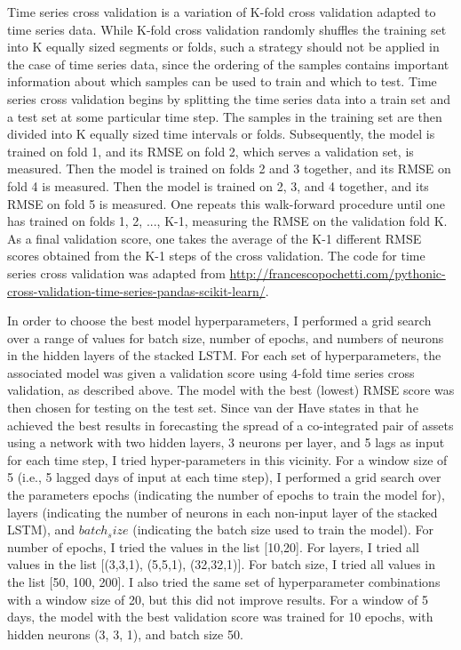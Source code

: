 \documentclass{article}
\begin{document}
Time series cross validation is a variation of K-fold cross validation adapted to time series data. While K-fold cross validation randomly shuffles the training set into K equally sized segments or folds, such a strategy should not be applied in the case of time series data, since the ordering of the samples contains important information about which samples can be used to train and which to test. Time series cross validation begins by splitting the time series data into a train set and a test set at some particular time step. The samples in the training set are then divided into K equally sized time intervals or folds. Subsequently, the model is trained on fold 1, and its RMSE on fold 2, which serves a validation set, is measured. Then the model is trained on folds 2 and 3 together, and its RMSE on fold 4 is measured. Then the model is trained on 2, 3, and 4 together, and its RMSE on fold 5 is measured. One repeats this walk-forward procedure until one has trained on folds 1, 2, ..., K-1, measuring the RMSE on the validation fold K. As a final validation score, one takes the average of the K-1 different RMSE scores obtained from the K-1 steps of the cross validation. The code for time series cross validation was adapted from \url{http://francescopochetti.com/pythonic-cross-validation-time-series-pandas-scikit-learn/}. 

In order to choose the best model hyperparameters, I performed a grid search over a range of values for batch size, number of epochs, and numbers of neurons in the hidden layers of the stacked LSTM. For each set of hyperparameters, the associated model was given a validation score using $4$-fold time series cross validation, as described above. The model with the best (lowest) RMSE score was then chosen for testing on the test set.  Since van der Have states in \cite{van2017pairs} that he achieved the best results in forecasting the spread of a co-integrated pair of assets using a network with two hidden layers, 3 neurons per layer, and 5 lags as input for each time step, I tried hyper-parameters in this vicinity. For a window size  of 5 (i.e., 5 lagged days of input at each time step), I performed a grid search over the parameters epochs (indicating the number of epochs to train the model for), layers (indicating the number of neurons in each non-input layer of the stacked LSTM), and $batch_size$ (indicating the batch size used to train the model). For number of epochs, I tried the values in the list [10,20]. For layers, I tried all values in the list [(3,3,1), (5,5,1), (32,32,1)]. For batch size, I tried all values in the list [50, 100, 200]. I also tried the same set of hyperparameter combinations with a window size of 20, but this did not improve results. For a window of 5 days, the model with the best validation score was trained for 10 epochs, with hidden neurons (3, 3, 1), and batch size 50. 
\end{document}

